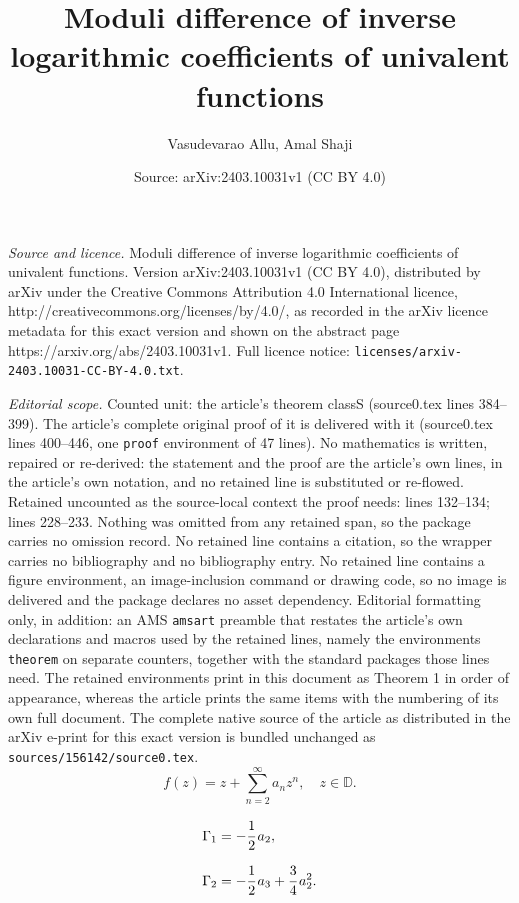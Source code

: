 \documentclass[10pt,a4paper]{amsart}
\title{Moduli difference of inverse logarithmic coefficients of univalent functions}
\author{Vasudevarao Allu, Amal Shaji}
\date{Source: arXiv:2403.10031v1 (CC BY 4.0)}
\begin{document}
\maketitle

\noindent\emph{Source and licence.} Moduli difference of inverse logarithmic coefficients of univalent functions. Version arXiv:2403.10031v1 (CC BY 4.0), distributed by arXiv under the Creative Commons Attribution 4.0 International licence, http://creativecommons.org/licenses/by/4.0/, as recorded in the arXiv licence metadata for this exact version and shown on the abstract page https://arxiv.org/abs/2403.10031v1. Full licence notice: \texttt{licenses/arxiv-2403.10031-CC-BY-4.0.txt}.\par\smallskip

\noindent\textit{Editorial scope.} Counted unit: the article's theorem classS (source0.tex lines 384--399). The article's complete original proof of it is delivered with it (source0.tex lines 400--446, one \texttt{proof} environment of 47 lines). No mathematics is written, repaired or re-derived: the statement and the proof are the article's own lines, in the article's own notation, and no retained line is substituted or re-flowed.  Retained uncounted as the source-local context the proof needs: lines 132--134; lines 228--233.  Nothing was omitted from any retained span, so the package carries no omission record.  No retained line contains a citation, so the wrapper carries no bibliography and no bibliography entry.  No retained line contains a figure environment, an image-inclusion command or drawing code, so no image is delivered and the package declares no asset dependency.  Editorial formatting only, in addition: an AMS \texttt{amsart} preamble that restates the article's own declarations and macros used by the retained lines, namely the environments \texttt{theorem} on separate counters, together with the standard packages those lines need.  The retained environments print in this document as Theorem 1 in order of appearance, whereas the article prints the same items with the numbering of its own full document.  The complete native source of the article as distributed in the arXiv e-print for this exact version is bundled unchanged as \texttt{sources/156142/source0.tex}.
\begin{equation}\label{S}
	f(z)= z+\sum_{n=2}^{\infty}a_n z^n, \quad z\in \mathbb{D}.
\end{equation}

\begin{equation}\label{Gammaaa}
\begin{aligned}
& \Gamma_{1}=-\cfrac{1}{2}\,a_2,\\[2mm]
& \Gamma_2=-\cfrac{1}{2}\, a_3+\cfrac{3}{4}\, a_2^2.
\end{aligned}
\end{equation}
\end{document}
